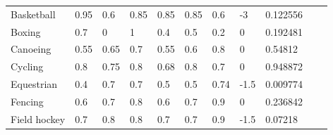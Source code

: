 \documentclass[a4paper]{article}
\begin{document}
\begin{table}[h]
\begin{tabular}{|l|lllllll|l|ll}
    Basketball                                  & \multicolumn{1}{l|}{0.95}     & \multicolumn{1}{l|}{0.6}      & \multicolumn{1}{l|}{0.85} & \multicolumn{1}{l|}{0.85} & \multicolumn{1}{l|}{0.85} & \multicolumn{1}{l|}{0.6}      & -3                      & 0.122556                                               &  &  \\ \cline{1-9}
    Boxing                                      & \multicolumn{1}{l|}{0.7}      & \multicolumn{1}{l|}{0}        & \multicolumn{1}{l|}{1}    & \multicolumn{1}{l|}{0.4}  & \multicolumn{1}{l|}{0.5}  & \multicolumn{1}{l|}{0.2}      & 0                       & 0.192481                                               &  &  \\ \cline{1-9}
    Canoeing                                    & \multicolumn{1}{l|}{0.55}     & \multicolumn{1}{l|}{0.65}     & \multicolumn{1}{l|}{0.7}  & \multicolumn{1}{l|}{0.55} & \multicolumn{1}{l|}{0.6}  & \multicolumn{1}{l|}{0.8}      & 0                       & 0.54812                                                &  &  \\ \cline{1-9}
    Cycling                                     & \multicolumn{1}{l|}{0.8}      & \multicolumn{1}{l|}{0.75}     & \multicolumn{1}{l|}{0.8}  & \multicolumn{1}{l|}{0.68} & \multicolumn{1}{l|}{0.8}  & \multicolumn{1}{l|}{0.7}      & 0                       & 0.948872                                               &  &  \\ \cline{1-9}
    Equestrian                                  & \multicolumn{1}{l|}{0.4}      & \multicolumn{1}{l|}{0.7}      & \multicolumn{1}{l|}{0.7}  & \multicolumn{1}{l|}{0.5}  & \multicolumn{1}{l|}{0.5}  & \multicolumn{1}{l|}{0.74}     & -1.5                    & 0.009774                                               &  &  \\ \cline{1-9}
    Fencing                                     & \multicolumn{1}{l|}{0.6}      & \multicolumn{1}{l|}{0.7}      & \multicolumn{1}{l|}{0.8}  & \multicolumn{1}{l|}{0.6}  & \multicolumn{1}{l|}{0.7}  & \multicolumn{1}{l|}{0.9}      & 0                       & 0.236842                                               &  &  \\ \cline{1-9}
    Field hockey                                & \multicolumn{1}{l|}{0.7}      & \multicolumn{1}{l|}{0.8}      & \multicolumn{1}{l|}{0.8}  & \multicolumn{1}{l|}{0.7}  & \multicolumn{1}{l|}{0.7}  & \multicolumn{1}{l|}{0.9}      & -1.5                    & 0.07218                                                &  &  \\ \cline{1-9}

\end{tabular}
\end{table}
\end{document}
